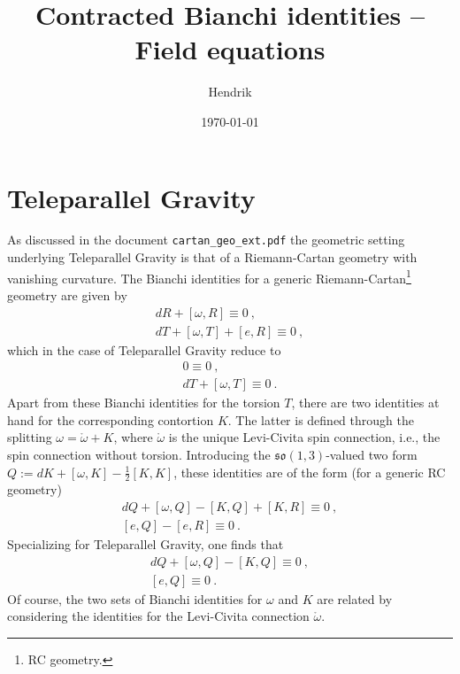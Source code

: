 \documentclass[11pt]{article}
\title{Contracted Bianchi identities -- Field equations}
\author{Hendrik}
\date{\today}
\begin{document}
\maketitle

\section{Teleparallel Gravity}

As discussed in the document \verb+cartan_geo_ext.pdf+ the 
geometric setting underlying Teleparallel Gravity is that of a 
Riemann-Cartan geometry with vanishing curvature. The Bianchi 
identities for a generic Riemann-Cartan\footnote{RC geometry.}  
geometry are given by
\begin{gather*}
	dR + [\omega,R] \equiv 0~,\\
	dT + [\omega,T] + [e,R] \equiv0~,
\end{gather*}
which in the case of Teleparallel Gravity reduce to
\begin{gather*}
	0 \equiv 0~,\\
	dT + [\omega,T] \equiv0~.
\end{gather*}
Apart from these Bianchi identities for the torsion $T$, there 
are two identities at hand for the corresponding contortion $K$.  
The latter is defined through the splitting $\omega = 
\mathring{\omega} + K$, where $\mathring{\omega}$ is the unique 
Levi-Civita spin connection, i.e., the spin connection without 
torsion.  Introducing the $\mathfrak{so}(1,3)$-valued two form $Q 
:= dK + [\omega,K] - \tfrac{1}{2}[K,K]$, these identities are of 
the form (for a generic RC geometry)
\begin{gather*}
	dQ + [\omega, Q] - [K,Q] + [K,R] \equiv 0~,\\
	[e,Q] - [e,R] \equiv 0~.
\end{gather*}
Specializing for Teleparallel Gravity, one finds that
\begin{subequations}
\begin{gather}
	\label{eq:bianchi_ISO_DQ}
	dQ + [\omega, Q] - [K,Q] \equiv 0~,\\
	\label{eq:bianchi_ISO_eQ}
	[e,Q] \equiv 0~.
\end{gather}
\end{subequations}
Of course, the two sets of Bianchi identities for $\omega$ and 
$K$ are related by considering the identities for the Levi-Civita 
connection $\mathring{\omega}$.
\end{document}

